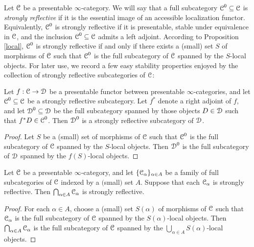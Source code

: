 Let $\operatorname{\mathcal{C}}$ be a presentable $\infty$-category. We will say that a full subcategory
$\operatorname{\mathcal{C}}^0 \subseteq \operatorname{\mathcal{C}}$ is {\it strongly reflective} if it is
the essential image of an accessible localization functor. Equivalently, $\operatorname{\mathcal{C}}^0$ is strongly reflective if it is presentable, stable under equivalence in $\operatorname{\mathcal{C}}$, and the inclusion
$\operatorname{\mathcal{C}}^0 \subseteq \operatorname{\mathcal{C}}$ admits a left adjoint. According to Proposition \ref{local}, $\operatorname{\mathcal{C}}^0$ is strongly reflective if and only if there exists a (small) set $S$ of morphisms of $\operatorname{\mathcal{C}}$ such that $\operatorname{\mathcal{C}}^0$ is the full subcategory of $\operatorname{\mathcal{C}}$ spanned by the $S$-local objects.
For later use, we record a few easy stability properties enjoyed by the collection of strongly reflective subcategories of $\operatorname{\mathcal{C}}$:

\begin{lemma}\label{stur2}
Let $f: \operatorname{\mathcal{C}} \rightarrow \operatorname{\mathcal{D}}$ be a presentable functor between presentable $\infty$-categories, and let $\operatorname{\mathcal{C}}^0 \subseteq \operatorname{\mathcal{C}}$ be a strongly reflective subcategory. Let $f^{\ast}$ denote a right adjoint of $f$, and let
$\operatorname{\mathcal{D}}^{0} \subseteq \operatorname{\mathcal{D}}$ be the full subcategory spanned by those objects
$D \in \operatorname{\mathcal{D}}$ such that $f^{\ast} D \in \operatorname{\mathcal{C}}^0$. Then $\operatorname{\mathcal{D}}^{0}$ is a strongly reflective subcategory of $\operatorname{\mathcal{D}}$.
\end{lemma}

\begin{proof}
Let $S$ be a (small) set of morphisms of $\operatorname{\mathcal{C}}$ such that $\operatorname{\mathcal{C}}^0$ is the full subcategory
of $\operatorname{\mathcal{C}}$ spanned by the $S$-local objects. Then $\operatorname{\mathcal{D}}^0$ is the full subcategory of $\operatorname{\mathcal{D}}$ spanned by the $f(S)$-local objects.
\end{proof}

\begin{lemma}\label{stur3}
Let $\operatorname{\mathcal{C}}$ be a presentable $\infty$-category, and let $\{ \operatorname{\mathcal{C}}_{\alpha} \}_{\alpha \in A}$ be a family of full subcategories of $\operatorname{\mathcal{C}}$ indexed by a $($small$)$ set $A$. Suppose that each
$\operatorname{\mathcal{C}}_{\alpha}$ is strongly reflective. Then
$\bigcap_{\alpha \in A} \operatorname{\mathcal{C}}_{\alpha}$ is strongly reflective.
\end{lemma}

\begin{proof}
For each $\alpha \in A$, choose a (small) set $S(\alpha)$ of morphisms of $\operatorname{\mathcal{C}}$ such that $\operatorname{\mathcal{C}}_{\alpha}$ is the full subcategory of $\operatorname{\mathcal{C}}$ spanned by the $S(\alpha)$-local objects.
Then $\bigcap_{\alpha \in A} \operatorname{\mathcal{C}}_{\alpha}$ is the full subcategory of $\operatorname{\mathcal{C}}$ spanned by the
$\bigcup_{\alpha \in A} S(\alpha)$-local objects.
\end{proof}

